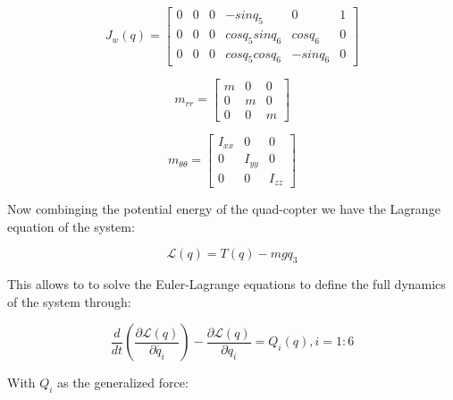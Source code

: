 \documentclass[twoside,twocolumn]{article}
\begin{document}
\begin{equation}
J_{w}(q)=\left[\begin{array}{cccccc}
0 & 0 & 0 & -sinq_{5} & 0 & 1\\
0 & 0 & 0 & cosq_{5}sinq_{6} & cosq_{6} & 0\\
0 & 0 & 0 & cosq_{5}cosq_{6} & -sinq_{6} & 0
\end{array}\right]
\end{equation}

\begin{equation}
m_{rr}=\left[\begin{array}{ccc}
m & 0 & 0\\
0 & m & 0\\
0 & 0 & m
\end{array}\right]
\end{equation}

\begin{equation}
m_{\theta\theta}=\left[\begin{array}{ccc}
I_{xx} & 0 & 0\\
0 & I_{yy} & 0\\
0 & 0 & I_{zz}
\end{array}\right]
\end{equation}

Now combinging the potential energy of the quad-copter we have the Lagrange equation of the system:

\begin{equation}
\mathcal{L}(q)=T(q)-mgq_{3}
\end{equation}

This allows to to solve the Euler-Lagrange equations to define the full dynamics of the system through:

\begin{equation}
\frac{d}{dt}(\frac{\partial\mathcal{L}(q)}{\partial\dot{q_{i}}})-\frac{\partial\mathcal{L}(q)}{\partial q_{i}}=Q_{i}(q), i=1:6
\end{equation}

With $Q_{i}$ as the generalized force:
\end{document}
